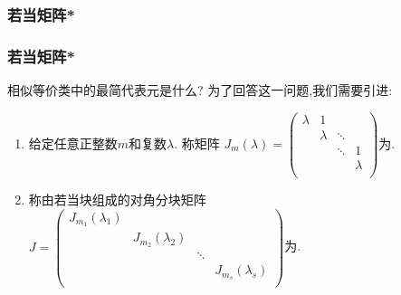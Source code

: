 \subsubsection{若当矩阵*}
\begin{frame}\frametitle{若当矩阵*}
相似等价类中的最简代表元是什么?
\pp
为了回答这一问题,我们需要引进:
\begin{definition}
\pp
\begin{enumerate}
\item 给定任意正整数$m$和复数$\lambda$. 称矩阵 $J_m(\lambda)=\begin{pmatrix}
\lambda&1&&\\&\lambda&\ddots&\\
&&\ddots&1\\&&&\lambda\\\end{pmatrix}$为.
\pp
\item 称由若当块组成的对角分块矩阵 $J=\begin{pmatrix}
J_{m_1}(\lambda_1)&&&\\&J_{m_2}(\lambda_2)&&\\
&&\ddots&\\&&&J_{m_s}(\lambda_s)\\\end{pmatrix}$为.
\end{enumerate}
\end{definition}
\end{frame}





